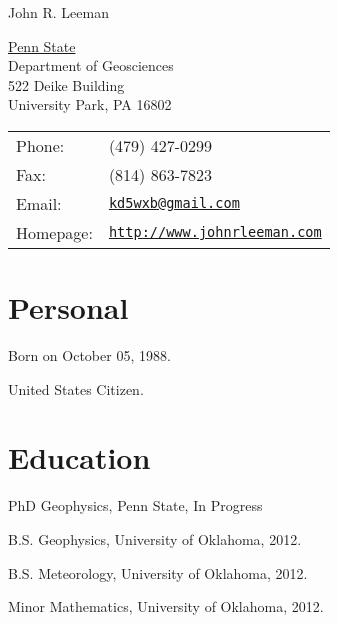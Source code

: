 \documentclass[letterpaper]{article}
\def\name{John R. Leeman}
\renewenvironment{itemize}{
  \begin{list}{}{
    \setlength{\leftmargin}{1.5em}
  }
}{
  \end{list}
}
\begin{document}
{\huge \name}


\vspace{0.25in}

\begin{minipage}{0.45\linewidth}
  \href{http://www.geosc.psu.edu/}{Penn State } \\
  Department of Geosciences \\
  522 Deike Building \\
   University Park, PA  16802
\end{minipage}
\begin{minipage}{0.45\linewidth}
  \begin{tabular}{ll}
    Phone: & (479) 427-0299 \\
    Fax: &  (814) 863-7823 \\
    Email: & \href{mailto:kd5wxb@gmail.com}{\tt kd5wxb@gmail.com} \\
    Homepage: & \href{http://www.johnrleeman.com}{\tt http://www.johnrleeman.com} \\
  \end{tabular}
\end{minipage}


\section*{Personal}

\begin{itemize}
\item Born on October 05, 1988.
\item United States Citizen.
\end{itemize}


\section*{Education}

\begin{itemize}
 \item PhD Geophysics, Penn State, In Progress

 \item B.S. Geophysics, University of Oklahoma, 2012.

  \item B.S. Meteorology, University of Oklahoma, 2012.

 \item Minor Mathematics, University of Oklahoma, 2012.
\end{itemize}
\end{document}
